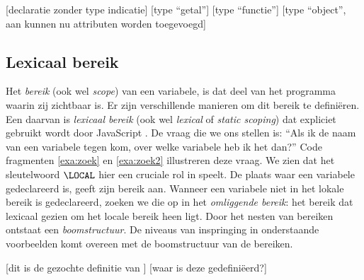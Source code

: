\begin{NoBreak}
\codeFragmentCaption
\begin{codelines}
  [declaratie zonder type indicatie]
  [type “getal”]
  [type “functie”]
  [type “object”, aan  kunnen nu attributen worden toegevoegd]
\end{codelines}
\end{NoBreak}

\subsection{Lexicaal bereik}

Het \emph{bereik} (ook wel \emph{scope}) van een variabele, is dat deel van het programma waarin zij zichtbaar is. Er zijn verschillende manieren om dit bereik te definiëren. Een daarvan is \emph{lexicaal bereik} (ook wel \emph{lexical} of \emph{static scoping}) dat expliciet gebruikt wordt door JavaScript \citep{javascript}.
De vraag die we ons stellen is: “Als ik de naam van een variabele tegen kom, over welke variabele heb ik het dan?” Code fragmenten \ref{exa:zoek} en \ref{exa:zoek2} illustreren deze vraag. We zien dat het sleutelwoord $\LOCAL$ hier een cruciale rol in speelt. De plaats waar een variabele gedeclareerd is, geeft zijn bereik aan. Wanneer een variabele niet in het lokale bereik is gedeclareerd, zoeken we die op in het \emph{omliggende bereik}: het bereik dat lexicaal gezien om het locale bereik heen ligt.
Door het nesten van bereiken ontstaat een \emph{boomstructuur}. De niveaus van inspringing in onderstaande voorbeelden komt overeen met de boomstructuur van de bereiken.%

\begin{NoBreak}
\codeFragmentCaption
\begin{codelines}
  [dit is de gezochte definitie van ]
  \codeLine{}
  [waar is deze  gedefiniëerd?]
\end{codelines}
\end{NoBreak}

